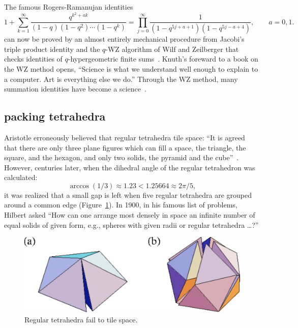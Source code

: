 \documentclass{llncs}
\begin{document}
The famous Rogers-Ramanujan identities
\[
1 + \sum_{k=1}^\infty \frac{q^{k^2+a k}}{(1-q)(1-q^2)\cdots (1-q^k)} = 
\prod_{j=0}^\infty \frac{1}{(1-q^{5j+a+1})(1- q^{5j - a +4})},
\qquad a = 0,1.
\]
can now be proved by an almost entirely mechanical procedure from
Jacobi's triple product identity and the $q$-WZ algorithm of Wilf and
Zeilberger that checks identities of $q$-hypergeometric finite
sums~\cite{PP94}.   Knuth's foreward to a book
on the WZ method opens, ``Science is what we understand well enough to
explain to a computer. Art is everything else we do.'' Through the WZ
method, many summation identities have become a science~\cite{PWZ}.


\subsection{packing  tetrahedra}

Aristotle erroneously believed that regular tetrahedra tile space:
``It is agreed that there are only three plane figures which can fill
a space, the triangle, the square, and the hexagon, and only two
solids, the pyramid and the cube''~\cite{Aristotle}.  However,
centuries later, when the dihedral angle of the regular tetrahedron
was calculated:
\[
\arccos(1/3) \approx 1.23 < 1.25664 \approx 2\pi/5,
\]
it was realized that a small gap is left when five regular tetrahedra
are grouped around a common edge (Figure~\ref{fig:gap}).  In 1900, in his famous list of
problems, Hilbert asked ``How can one arrange most densely in space an
infinite number of equal solids of given form, e.g., spheres with
given radii or regular tetrahedra \dots?''

\begin{figure}[h!]
  \centering
\includegraphics[scale=0.3]{tetrahedral_defect.pdf}
  \caption{Regular tetrahedra fail to tile space.}
\label{fig:gap}
\end{figure}
\end{document}
